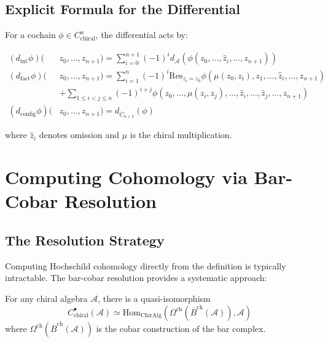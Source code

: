 \subsection{Explicit Formula for the Differential}

For a cochain $\phi \in C^n_{\text{chiral}}$, the differential acts by:

\begin{align}
(d_{\text{int}}\phi)(&z_0,\ldots,z_{n+1}) = \sum_{i=0}^{n+1} (-1)^i d_{\mathcal{A}}(\phi(z_0,\ldots,\hat{z}_i,\ldots,z_{n+1})) \\
(d_{\text{fact}}\phi)(&z_0,\ldots,z_{n+1}) = \sum_{i=1}^n (-1)^i \text{Res}_{z_i = z_0} \phi(\mu(z_0,z_i),z_1,\ldots,\hat{z}_i,\ldots,z_{n+1}) \\
&+ \sum_{1 \leq i < j \leq n} (-1)^{i+j} \phi(z_0,\ldots,\mu(z_i,z_j),\ldots,\hat{z}_i,\ldots,\hat{z}_j,\ldots,z_{n+1}) \\
(d_{\text{config}}\phi)(&z_0,\ldots,z_{n+1}) = d_{\overline{C}_{n+2}}(\phi)
\end{align}

where $\hat{z}_i$ denotes omission and $\mu$ is the chiral multiplication.

\section{Computing Cohomology via Bar-Cobar Resolution}

\subsection{The Resolution Strategy}

Computing Hochschild cohomology directly from the definition is typically intractable. The bar-cobar resolution provides a systematic approach:

\begin{theorem}
For any chiral algebra $\mathcal{A}$, there is a quasi-isomorphism
\[
C^{\bullet}_{\text{chiral}}(\mathcal{A}) \simeq \text{Hom}_{\text{ChirAlg}}(\Omega^{\text{ch}}(\overline{B}^{\text{ch}}(\mathcal{A})), \mathcal{A})
\]
where $\Omega^{\text{ch}}(\overline{B}^{\text{ch}}(\mathcal{A}))$ is the cobar construction of the bar complex.
\end{theorem}

